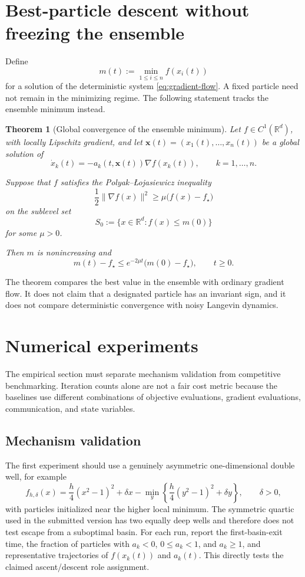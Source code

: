 \documentclass{article}
\theoremstyle{plain}
\newtheorem{theorem}{Theorem}[section]
\theoremstyle{definition}
\theoremstyle{remark}
\begin{document}
\section{Best-particle descent without freezing the ensemble}
Define
\[
 m(t):=\min_{1\le i\le n} f(x_i(t))
\]
for a solution of the deterministic system \eqref{eq:gradient-flow}.  A fixed particle need not remain in the minimizing regime.  The following statement tracks the ensemble minimum instead.

\begin{theorem}[Global convergence of the ensemble minimum]
\label{thm:rate-of-convergence-minimizing-particle}
Let \(f\in C^1(\mathbb R^d)\), with locally Lipschitz gradient, and let
\(\mathbf x(t)=(x_1(t),\ldots,x_n(t))\) be a global solution of
\[
    \dot x_k(t) = -a_k(t,\mathbf x(t))\nabla f(x_k(t)), \qquad k=1,\ldots,n.
\]

Suppose that \(f\) satisfies the Polyak--\L{}ojasiewicz inequality
\[
    \frac12\|\nabla f(x)\|^2 \ge\mu\bigl(f(x)-f_\star\bigr)
\]
on the sublevel set
\[
    S_0:=\{x\in\mathbb R^d:f(x)\le m(0)\}
\]
for some \(\mu>0\).

Then \(m\) is nonincreasing and
\[
    m(t)-f_\star \le e^{-2\mu t}\bigl(m(0)-f_\star\bigr), \qquad t\ge0.
\]
\end{theorem}

The theorem compares the best value in the ensemble with ordinary gradient flow.  It does not claim that a designated particle has an invariant sign, and it does not compare deterministic convergence with noisy Langevin dynamics.

\section{Numerical experiments}
\label{sec:numerical-experiments}

The empirical section must separate mechanism validation from competitive benchmarking.  Iteration counts alone are not a fair cost metric because the baselines use different combinations of objective evaluations, gradient evaluations, communication, and state variables.

\subsection{Mechanism validation}
The first experiment should use a genuinely asymmetric one-dimensional double well, for example
\[
 f_{h,\delta}(x)=\frac{h}{4}(x^2-1)^2+\delta x-\min_y\left\{\frac{h}{4}(y^2-1)^2+\delta y\right\},
 \qquad \delta>0,
\]
with particles initialized near the higher local minimum.  The symmetric quartic used in the submitted version has two equally deep wells and therefore does not test escape from a suboptimal basin.  For each run, report the first-basin-exit time, the fraction of particles with \(a_k<0\), \(0\le a_k<1\), and \(a_k\ge1\), and representative trajectories of \(f(x_k(t))\) and \(a_k(t)\).  This directly tests the claimed ascent/descent role assignment.
\end{document}
